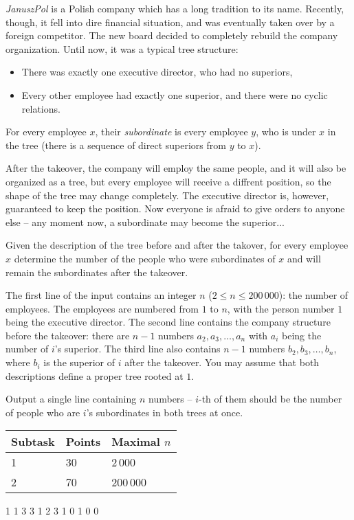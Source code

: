 




\textit{JanuszPol} is a Polish company which has a long tradition to its name. Recently, though, it fell into dire financial situation, and was eventually taken over by a foreign competitor. The new board decided to completely rebuild the company organization. Until now, it was a typical tree structure:

\begin{itemize}
 \item There was exactly one executive director, who had no superiors,
 \item Every other employee had exactly one superior, and there were no cyclic relations.
\end{itemize}

For every employee $x$, their \textit{subordinate} is every employee $y$, who is under $x$ in the tree (there is a sequence of direct superiors from $y$ to $x$).

After the takeover, the company will employ the same people, and it will also be organized as a tree, but every employee will receive a diffrent position, so the shape of the tree may change completely. The executive director is, however, guaranteed to keep the position. Now everyone is afraid to give orders to anyone else -- any moment now, a subordinate may become the superior...


Given the description of the tree before and after the takover, for every employee $x$ determine the number of the people who were subordinates of $x$ and will remain the subordinates after the takeover.


The first line of the input contains an integer $n$ ($2 \leq n \leq 200\,000$): the number of employees. The employees are numbered from $1$ to $n$, with the person number $1$ being the executive director. The second line contains the company structure before the takeover: there are $n-1$ numbers $a_2, a_3, \ldots, a_n$ with $a_i$ being the number of $i$'s superior. The third line also contains $n-1$ numbers $b_2, b_3, \ldots, b_n$, where $b_i$ is the superior of $i$ after the takeover. You may assume that both descriptions define a proper tree rooted at $1$.


Output a single line containing $n$ numbers -- $i$-th of them should be the number of people who are $i$'s subordinates in both trees at once.


\centering
\begin{tabular}{|l|l|l|}
\hline
Subtask & Points & Maximal $n$  \\ \hline
1       & 30     & 2\,000          \\ \hline
2       & 70     & 200\,000        \\ \hline
\end{tabular}


1 1 3 3
1 2 3 1
 0 1 0 0 

\sampleEND


